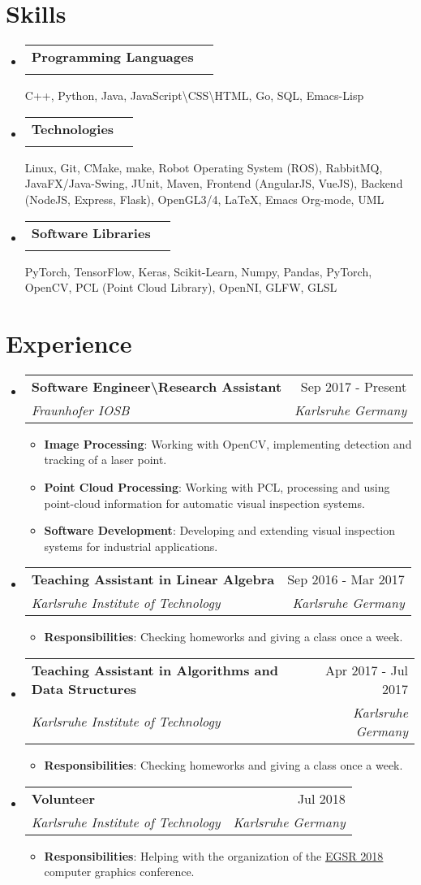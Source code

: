 \documentclass[letterpaper,10pt]{article}
\makeatletter
\newcommand{\resumeItem}[2]{
\item\small{
    \textbf{#1}{: #2 \vspace{-2pt}}
  }
}
\newcommand{\resumeSubheading}[4]{
  \vspace{-1pt}\item[]
  \begin{tabular*}{0.98\textwidth}{l@{\extracolsep{\fill}}r}
    \hspace{-10pt}\textbf{#1} & #2 \\
    \hspace{-10pt}\textit{\small#3} & \textit{\small #4} \\
  \end{tabular*}\vspace{-5pt}
}
\newcommand{\resumeSubHeadingListStart}{\begin{itemize}[leftmargin=*]}
\newcommand{\resumeSubHeadingListEnd}{\end{itemize}}
\newcommand{\resumeItemListStart}{\begin{itemize}}
\newcommand{\resumeItemListEnd}{\end{itemize}\vspace{-5pt}}
\newcommand{\shorterSection}[1]{\vspace{-10pt}\section{#1}}
\makeatother
\begin{document}
\shorterSection{Skills}
\resumeSubHeadingListStart
\resumeSubheading{Programming Languages}{}{\vspace{-5pt}}{}
C++, Python, Java, JavaScript\textbackslash CSS\textbackslash HTML, Go, SQL, Emacs-Lisp
\resumeSubheading{Technologies}{}{\vspace{-5pt}}{}
Linux, Git, CMake, make, Robot Operating System (ROS), RabbitMQ, JavaFX/Java-Swing, JUnit, Maven, Frontend (AngularJS, VueJS), Backend (NodeJS, Express, Flask), OpenGL3/4, LaTeX, Emacs Org-mode, UML
\resumeSubheading{Software Libraries}{}{\vspace{-5pt}}{}
PyTorch, TensorFlow, Keras, Scikit-Learn, Numpy, Pandas, PyTorch, OpenCV, PCL (Point Cloud Library), OpenNI, GLFW, GLSL
\resumeSubHeadingListEnd
\vspace{7pt}

\shorterSection{Experience}
\resumeSubHeadingListStart

\resumeSubheading
{Software Engineer\textbackslash Research Assistant}{Sep 2017 - Present}
{Fraunhofer IOSB}{Karlsruhe Germany}
\resumeItemListStart
\resumeItem{Image Processing}
{Working with OpenCV, implementing detection and tracking of a laser point.}
\resumeItem{Point Cloud Processing}
{Working with PCL, processing and using point-cloud information for automatic visual inspection systems.}
\resumeItem{Software Development}
{Developing and extending visual inspection systems for industrial applications.}
\resumeItemListEnd

\resumeSubheading
{Teaching Assistant in Linear Algebra}{Sep 2016 - Mar 2017}
{Karlsruhe Institute of Technology}{Karlsruhe Germany}
\resumeItemListStart
\resumeItem{Responsibilities}
{Checking homeworks and giving a class once a week.}
\resumeItemListEnd

\resumeSubheading
{Teaching Assistant in Algorithms and Data Structures}{Apr 2017 - Jul 2017}
{Karlsruhe Institute of Technology}{Karlsruhe Germany}
\resumeItemListStart
\resumeItem{Responsibilities}
{Checking homeworks and giving a class once a week.}
\resumeItemListEnd

\resumeSubheading
{Volunteer}{Jul 2018}
{Karlsruhe Institute of Technology}{Karlsruhe Germany}
\resumeItemListStart
\resumeItem{Responsibilities}
{Helping with the organization of the \href{https://cg.ivd.kit.edu/egsr18/}{\color{blue}\underline{EGSR 2018}} computer graphics conference.}
\resumeItemListEnd

\resumeSubHeadingListEnd
\end{document}
